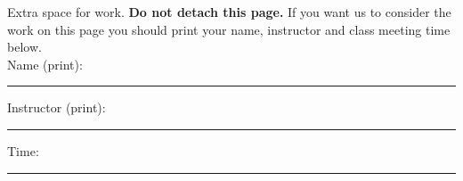 \documentclass[9pt,addpoints]{exam}
\begin{document}
Extra space for work. \textbf{Do not detach this page.} If you want us to consider the work on this
    page you should print your name, instructor and class meeting time below. \\ [10pt]
    Name (print): \rule{3cm}{0.2mm} Instructor (print):
    \rule{3cm}{0.2mm}  Time: \rule{3cm}{0.2mm}


    \iftoggle{compress}{\vfill}{~\\}
\end{document}
